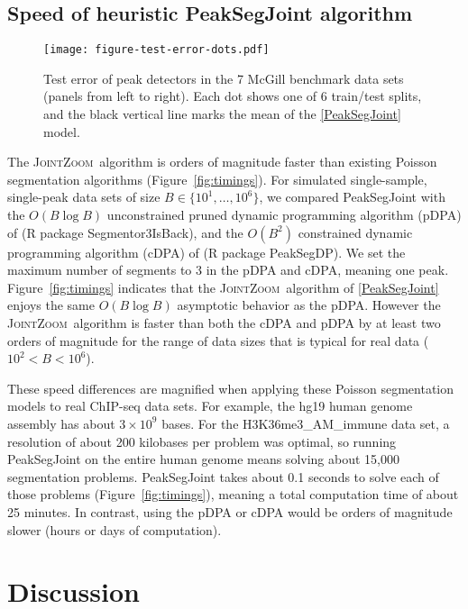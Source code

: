 \documentclass{article} %
\newcommand{\JointHeuristic}{\textsc{JointZoom}}
\begin{document}
\subsection{Speed of heuristic PeakSegJoint algorithm}

\begin{figure}[b!]
  \centering
  \texttt{[image: figure-test-error-dots.pdf]}
  \vskip -0.5cm
  \caption{Test error of peak detectors in the 7 McGill 
    benchmark data sets (panels from left to right). Each dot shows
    one of 6 train/test splits, and the black vertical line marks the
    mean of the \ref{PeakSegJoint} model.}
  \label{fig:test-error-dots}
\end{figure}

The \JointHeuristic\ algorithm is orders of magnitude faster than
existing Poisson segmentation algorithms
(Figure~\ref{fig:timings}). For simulated single-sample, single-peak
data sets of size $B\in\{10^1, \dots, 10^6\}$, we compared
PeakSegJoint with the $O(B\log B)$ unconstrained pruned dynamic
programming algorithm (pDPA) of \citet{Segmentor} (R package
Segmentor3IsBack), and the $O(B^2)$ constrained dynamic programming
algorithm (cDPA) of \citet{HOCKING-PeakSeg} (R package PeakSegDP). We
set the maximum number of segments to 3 in the pDPA and cDPA, meaning
one peak. Figure~\ref{fig:timings} indicates that the \JointHeuristic\
algorithm of \ref{PeakSegJoint} enjoys the same $O(B \log B)$
asymptotic behavior as the pDPA. However the \JointHeuristic\
algorithm is faster than both the cDPA and pDPA by at least two orders
of magnitude for the range of data sizes that is typical for real data
($10^2 < B < 10^6$).

These speed differences are magnified when applying these Poisson
segmentation models to real ChIP-seq data sets. For example, the hg19
human genome assembly has about $3\times 10^9$ bases. For the
H3K36me3\_AM\_immune data set, a resolution of about 200 kilobases per
problem was optimal, so running PeakSegJoint on the entire human
genome means solving about 15,000 segmentation problems. PeakSegJoint
takes about 0.1 seconds to solve each of those problems
(Figure~\ref{fig:timings}), meaning a total computation time of about
25 minutes. In contrast, using the pDPA or cDPA would be orders of
magnitude slower (hours or days of computation).

\section{Discussion}
\label{sec:discussion}
\end{document}
